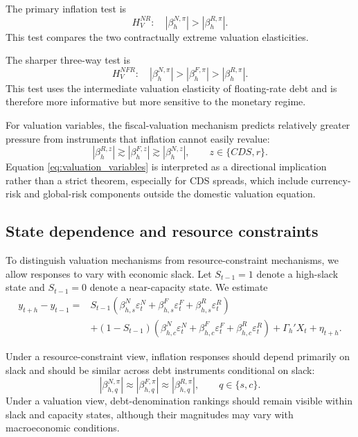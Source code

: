 \documentclass[12pt,a4paper]{article}
\begin{document}
The primary inflation test is
\begin{equation}
H_{V}^{NR}:\quad |\beta_h^{N,\pi}|>|\beta_h^{R,\pi}|.
\label{eq:test_nr}
\end{equation}
This test compares the two contractually extreme valuation elasticities.

The sharper three-way test is
\begin{equation}
H_{V}^{NFR}:\quad |\beta_h^{N,\pi}|>|\beta_h^{F,\pi}|>|\beta_h^{R,\pi}|.
\label{eq:test_nfr}
\end{equation}
This test uses the intermediate valuation elasticity of floating-rate debt and is therefore more informative but more sensitive to the monetary regime.

For valuation variables, the fiscal-valuation mechanism predicts relatively greater pressure from instruments that inflation cannot easily revalue:
\begin{equation}
|\beta_h^{R,z}|\gtrsim |\beta_h^{F,z}|\gtrsim |\beta_h^{N,z}|,
\qquad
z\in\{CDS,r\}.
\label{eq:valuation_variables}
\end{equation}
Equation \eqref{eq:valuation_variables} is interpreted as a directional implication rather than a strict theorem, especially for CDS spreads, which include currency-risk and global-risk components outside the domestic valuation equation.

\subsection{State dependence and resource constraints}

To distinguish valuation mechanisms from resource-constraint mechanisms, we allow responses to vary with economic slack. Let \(S_{t-1}=1\) denote a high-slack state and \(S_{t-1}=0\) denote a near-capacity state. We estimate
\begin{align}
y_{t+h}-y_{t-1}
=&
S_{t-1}
\left(
\beta_{h,s}^{N}\varepsilon_t^N
+
\beta_{h,s}^{F}\varepsilon_t^F
+
\beta_{h,s}^{R}\varepsilon_t^R
\right)
\nonumber\\
&+
(1-S_{t-1})
\left(
\beta_{h,c}^{N}\varepsilon_t^N
+
\beta_{h,c}^{F}\varepsilon_t^F
+
\beta_{h,c}^{R}\varepsilon_t^R
\right)
+
\Gamma_h'X_t
+\eta_{t+h}.
\label{eq:lp_state}
\end{align}

Under a resource-constraint view, inflation responses should depend primarily on slack and should be similar across debt instruments conditional on slack:
\begin{equation}
|\beta_{h,q}^{N,\pi}|
\approx
|\beta_{h,q}^{F,\pi}|
\approx
|\beta_{h,q}^{R,\pi}|,
\qquad
q\in\{s,c\}.
\end{equation}
Under a valuation view, debt-denomination rankings should remain visible within slack and capacity states, although their magnitudes may vary with macroeconomic conditions.
\end{document}
